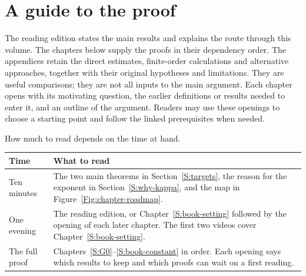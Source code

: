 \documentclass[12pt,oneside,openany]{book}
\numberwithin{equation}{section}
\theoremstyle{nogostyle}
\theoremstyle{definition}
\begin{document}
\begin{abstract}
  An independent upper bound establishes finiteness at the scale $T^\kappa$.
  The identification of the constant combines Gaussian phase operators,
  convergence from the regularized noise, estimates uniform in the spatial
  localization radius, and finite optimization with nonnegative Gram entries.
  We also obtain bounds for the same constant through spatial energies and
  occupation measures, including explicit bounds for spatial white noise in
  one dimension.
\end{abstract}

\tableofcontents
\listoffigures

\chapter*{A guide to the proof}

The reading edition states the main results and explains the route through
this volume. The chapters below supply the proofs in their dependency order.
The appendices retain the direct estimates, finite-order calculations and
alternative approaches, together with their original hypotheses and limitations.
They are useful comparisons; they are not all inputs to the main argument. Each
chapter opens with its motivating question, the earlier definitions or results
needed to enter it, and an outline of the argument. Readers may use these
openings to choose a starting point and follow the linked prerequisites when
needed.

How much to read depends on the time at hand.

\begin{center}
\begin{tabular}{@{}p{}p{}@{}}
  \toprule
  Time & What to read \\
  \midrule
  Ten minutes & The two main theorems in Section~\ref{S:targets}, the reason for the exponent in Section~\ref{S:why-kappa}, and the map in Figure~\ref{Fig:chapter-roadmap}. \\
  One evening & The reading edition, or Chapter~\ref{S:book-setting} followed by the opening of each later chapter. The first two videos cover Chapter~\ref{S:book-setting}. \\
  The full proof & Chapters~\ref{S:G0}--\ref{S:book-constant} in order. Each opening says which results to keep and which proofs can wait on a first reading. \\
  \bottomrule
\end{tabular}
\end{center}
\end{document}
